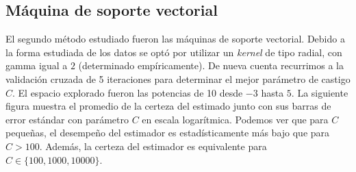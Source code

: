 \documentclass{article}
\begin{document}
\subsection{Máquina de soporte vectorial}
El segundo método estudiado fueron las máquinas de soporte vectorial. Debido a la forma estudiada de los datos se optó por utilizar un \emph{kernel} de tipo radial, con gamma igual a $2$ (determinado empíricamente). De nueva cuenta recurrimos a la validación cruzada de 5 iteraciones para determinar el mejor parámetro de castigo $C$. El espacio explorado fueron las potencias de 10 desde $-3$ hasta $5$. La siguiente figura muestra el promedio de la certeza del estimado junto con sus barras de error estándar con parámetro $C$ en escala logarítmica. Podemos ver que para $C$ pequeñas, el desempeño del estimador es estadísticamente más bajo que para $C > 100$. Además, la certeza del estimador es equivalente para $C \in \{100, 1000, 10000\}$.
\end{document}
